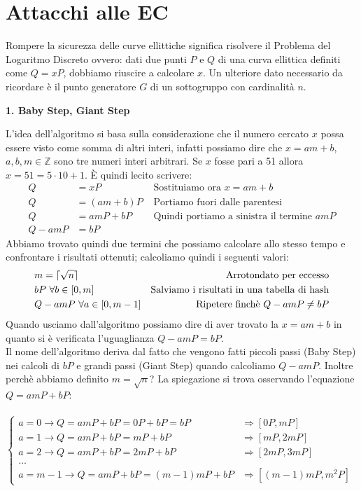 \documentclass[a4paper,12pt]{tesiinfo}
\DeclarePairedDelimiter\ceil{\lceil}{\rceil}
\begin{document}
\chapter{Attacchi alle EC}
Rompere la sicurezza delle curve ellittiche significa risolvere il Problema del Logaritmo Discreto ovvero: dati due punti $P$ e $Q$ di una curva ellittica definiti come $Q = xP$, dobbiamo riuscire a calcolare $x$. Un ulteriore dato necessario da ricordare \`e il punto generatore $G$ di un sottogruppo con cardinalit\`a $n$.
\\
\begin{center}
  \textbf{1. Baby Step, Giant Step}
\end{center}
L'idea dell'algoritmo si basa sulla considerazione che il numero cercato $x$ possa essere visto come somma di altri interi, infatti possiamo dire che $x = am+b$, $a, b, m \in \mathbb{Z}$ sono tre numeri interi arbitrari. Se $x$ fosse pari a 51 allora $x = 51 = 5 \cdot 10 + 1$. \`E quindi lecito scrivere:
\begin{align*}
  Q &= xP &\text{ Sostituiamo ora }x = am+b\\
  Q &= (am+b)P &\text{ Portiamo fuori dalle parentesi }\\
  Q &= amP+bP &\text{ Quindi portiamo a sinistra il termine }amP\\
  Q -amP &= bP
\end{align*}
Abbiamo trovato quindi due termini che possiamo calcolare allo stesso tempo e confrontare i risultati ottenuti; calcoliamo quindi i seguenti valori:
\begin{align*}
  &m = \ceil{\sqrt{n}} &\text{Arrotondato per eccesso}\\
  &bP \text{ }\forall b \in [0, m] &\text{Salviamo i risultati in una tabella di hash}\\
  &Q -amP \text{ }\forall a \in [0, m-1] &\text{Ripetere finch\`e } Q -amP \ne bP
\end{align*}
Quando usciamo dall'algoritmo possiamo dire di aver trovato la $x = am+b$ in quanto si \`e verificata l'uguaglianza $Q -amP = bP$.
\\
Il nome dell'algoritmo deriva dal fatto che vengono fatti piccoli passi (Baby Step) nei calcoli di $bP$ e grandi passi (Giant Step) quando calcoliamo $Q-amP$. Inoltre perch\`e abbiamo definito $m = \sqrt{n}$? La spiegazione si trova osservando l'equazione $Q = amP+bP$:\\
\\
$\begin{cases}
  a = 0 \to Q=amP+bP=0P+bP=bP &\Rightarrow [0P, mP]\\
  a = 1 \to Q=amP+bP=mP+bP &\Rightarrow [mP, 2mP]\\
  a = 2 \to Q=amP+bP=2mP+bP &\Rightarrow [2mP, 3mP]\\
  \ldots\\
  a = m-1 \to Q=amP+bP=(m-1)mP+bP &\Rightarrow [(m-1)mP, m^2P]
\end{cases}$
\end{document}
